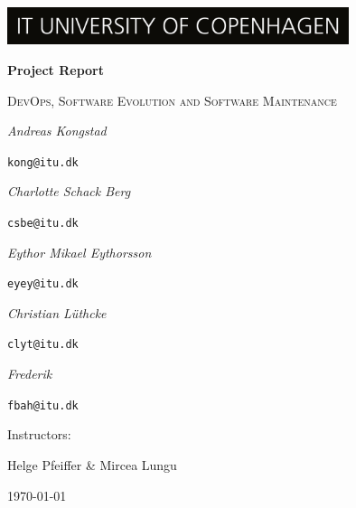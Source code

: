 \documentclass{scrartcl}
\begin{document}
\begin{titlepage}
    \centering
    \includegraphics[width=10cm]{images/ITU_logo_UK jpg.jpg}
    \vspace{1.5cm}
    
	{\huge\bfseries Project Report\par}
	\vspace{1cm}
    {\scshape\Large DevOps, Software Evolution and Software Maintenance \par}
	\vspace{2cm}
	{\Large\itshape Andreas Kongstad}\par
	\texttt{kong@itu.dk}\par
	\vspace{0.5cm}
	{\Large\itshape Charlotte Schack Berg}\par
	\texttt{csbe@itu.dk}\par
	\vspace{0.5cm}
	{\Large\itshape Eythor Mikael Eythorsson}\par
	\texttt{eyey@itu.dk}\par
	\vspace{0.5cm}
	{\Large\itshape Christian Lüthcke}\par
	\texttt{clyt@itu.dk}\par
	\vspace{0.5cm}
	{\Large\itshape Frederik}\par
	\texttt{fbah@itu.dk}\par
	\vfill
	Instructors:\par
    Helge Pfeiffer \& Mircea Lungu

	\vspace{1cm}

	{\large \today\par}
\end{titlepage}

\newpage
\tableofcontents


\newpage



\end{document}

